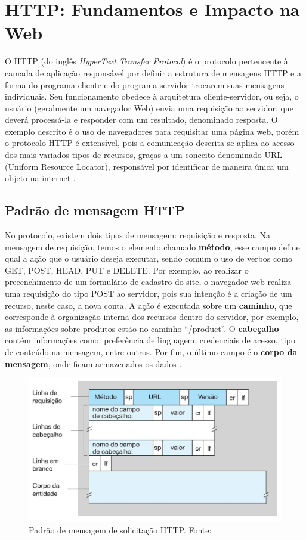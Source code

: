 \section{HTTP: Fundamentos e Impacto na Web}

O HTTP (do inglês \textit{HyperText Transfer Protocol}) é o protocolo pertencente à camada de aplicação
responsável por definir a estrutura de mensagens HTTP e a forma do programa cliente e do programa servidor 
trocarem suas mensagens individuais. Seu funcionamento obedece à arquitetura cliente-servidor, ou seja, o
usuário (geralmente um navegador Web) envia uma requisição ao servidor, que deverá processá-la e responder 
com um resultado, denominado resposta. O exemplo descrito é o uso de navegadores para requisitar uma página web, porém 
o protocolo HTTP é extensível, pois a comunicação descrita se aplica ao acesso dos mais variados tipos de recursos, graças a
um conceito denominado URL (Uniform Resource Locator), responsável por identificar de maneira única um objeto na internet \cite[pp. 72]{redes-kurose2010}.

\subsection{Padrão de mensagem HTTP}

No protocolo, existem dois tipos de mensagem: requisição e resposta. Na mensagem de requisição, temos o elemento
chamado \textbf{método}, esse campo define qual a ação que o usuário deseja executar, sendo comum o uso de verbos
como GET, POST, HEAD, PUT e DELETE. Por exemplo, ao realizar o preeenchimento de um formulário de cadastro do site, o
navegador web realiza uma requisição do tipo POST ao servidor, pois sua intenção é a criação de um recurso,
neste caso, a nova conta. A ação é executada sobre um \textbf{caminho}, que corresponde à organização interna dos recursos 
dentro do servidor, por exemplo, as informações sobre produtos estão no caminho ``/product''. O \textbf{cabeçalho} contém informações como: preferência de linguagem,
credenciais de acesso, tipo de conteúdo na mensagem, entre outros. Por fim, o último campo é o \textbf{corpo da mensagem}, 
onde ficam armazenados os dados \cite[pp. 77]{redes-kurose2010}.

\begin{figure}[ht]
    \centering
    \includegraphics[width=.55\textwidth]{img/mensagem-http-solicitação.png}
    \caption{Padrão de mensagem de solicitação HTTP. Fonte:\cite{redes-kurose2010}}\label{figMessageRequest}
\end{figure}

